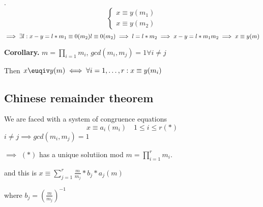 \ProofBackward.
\[
  \begin{cases}
    x \equiv y (m_1) \\
    x \equiv y (m_2) 
  \end{cases}
\]
\[
  \implies \exists l: x-y = l* m_1 \equiv 0 (m_2)\\
  l \equiv 0 (m_2) \implies l = l * m_2 
    \implies x-y = l* m_1 m_2
    \implies x \equiv y (m)
\]

\textbf{Corollary.}
$m = \prod_{i=1} m_i$, $ gcd(m_i, m_j) = 1 \forall i \neq j$

Then $x \euqiv y (m) \iff \forall i = 1, \ldots, r : x \equiv y (m_i)$

\subsection{Chinese remainder theorem}
We are faced with a system of congruence equations
\[
  x \equiv a_i (m_i) \quad 1 \leq i \leq r (*)
\]
$i \neq j \implies gcd(m_i, m_j) = 1$

$\implies$ $(*)$ has a unique solutiion mod $m = \prod_{i = 1}^r m_i$.

and this is $x \equiv \sum_{j=1}^r \frac {m}{m_j} * b_j * a_j (m)$

where $b_j = \left( \frac{m}{m_j} \right) ^{-1}$
